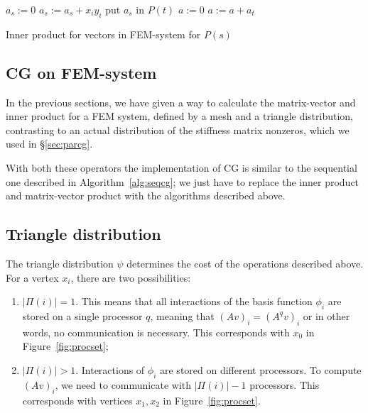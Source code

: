 \documentclass[11pt]{amsart}
\theoremstyle{definition}
\begin{document}
\begin{algorithm}[H]
  $a_s := 0$\;
	 {
	  $a_s := a_s + x_i y_i$\;
	}
   {
		put $a_s$ in $P(t)$\;
	}
  $a := 0$\;
   {
		$a := a + a_t$\;
	}
 \caption{Inner product for vectors in FEM-system for $P(s)$}
 \label{alg:fem_ip}
\end{algorithm}

\subsection{CG on FEM-system}
In the previous sections, we have given a way to calculate the matrix-vector and inner product for a FEM system, defined by a mesh and a triangle distribution, contrasting to an actual distribution of the stiffness matrix nonzeros, which we used in \S\ref{sec:parcg}.

With both these operators the implementation of CG is similar to the sequential one described in Algorithm~\ref{alg:seqcg}; we just have to replace the inner product and matrix-vector product with the algorithms described above.
\subsection{Triangle distribution}
The triangle distribution $\psi$ determines the cost of the operations described above. For a vertex $x_i$, there are two possibilities:
\begin{enumerate}
  \item $|\Pi(i)| = 1$. This means that all interactions of the basis function $\phi_i$ are stored on a single processor $q$, meaning that $(Av)_i = (A^qv)_i$ or in other words, no communication is necessary. This corresponds with $x_0$ in Figure~\ref{fig:procset};
  \item $|\Pi(i)| > 1$. Interactions of $\phi_i$ are stored on different processors. To compute $(Av)_i$, we need to communicate with $|\Pi(i)|-1$ processors. This corresponds with vertices $x_1, x_2$ in Figure~\ref{fig:procset}.
\end{enumerate}
\end{document}
